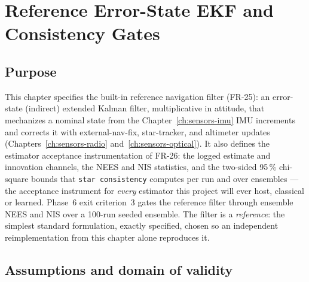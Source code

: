\chapter{Reference Error-State EKF and Consistency Gates}
\label{ch:ekf}

\section{Purpose}
\label{sec:ekf:purpose}

This chapter specifies the built-in reference navigation filter (FR-25):
an error-state (indirect) extended Kalman filter, multiplicative in
attitude, that mechanizes a nominal state from the
Chapter~\ref{ch:sensors-imu} IMU increments and corrects it with
external-nav-fix, star-tracker, and altimeter updates
(Chapters~\ref{ch:sensors-radio} and~\ref{ch:sensors-optical}). It also
defines the estimator acceptance instrumentation of FR-26: the logged
estimate and innovation channels, the NEES and NIS statistics, and the
two-sided 95\,\% chi-square bounds that \texttt{star consistency}
computes per run and over ensembles --- the acceptance instrument for
\emph{every} estimator this project will ever host, classical or
learned. Phase~6 exit criterion~3 gates the reference filter through
ensemble NEES and NIS over a 100-run seeded ensemble. The filter is a
\emph{reference}: the simplest standard formulation, exactly specified,
chosen so an independent reimplementation from this chapter alone
reproduces it.

\section{Assumptions and domain of validity}
\label{sec:ekf:domain}

